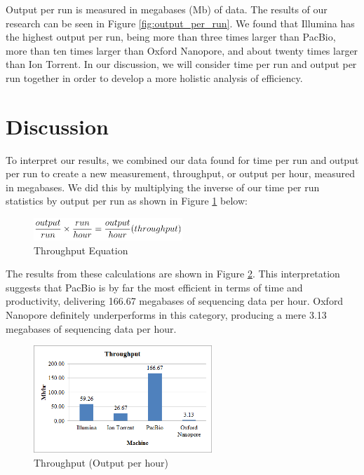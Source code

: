 \documentclass[12pt,letterpaper]{report}
\begin{document}
Output per run is measured in megabases (Mb) of data. The results of our research can be seen in Figure \ref{fig:output_per_run}. We found that Illumina has the highest output per run, being more than three times larger than PacBio, more than ten times larger than Oxford Nanopore, and about twenty times larger than Ion Torrent. In our discussion, we will consider time per run and output per run together in order to develop a more holistic analysis of efficiency.

\section{Discussion}

To interpret our results, we combined our data found for time per run and output per run to create a new measurement, throughput, or output per hour, measured in megabases. We did this by multiplying the inverse of our time per run statistics by output per run as shown in Figure \ref{fig:throughput_eq} below:

\begin{figure}[hr] %
  \begin{center}
    \includegraphics[width=0.5\textwidth]{throughput_eq.png}
  \end{center}
  \caption{Throughput Equation}
  \vspace{-10pt}
  \label{fig:throughput_eq}
\end{figure}

The results from these calculations are shown in Figure \ref{fig:throughput_per_hour}. This interpretation suggests that PacBio is by far the most efficient in terms of time and productivity, delivering 166.67 megabases of sequencing data per hour. Oxford Nanopore definitely underperforms in this category, producing a mere 3.13 megabases of sequencing data per hour. 

\begin{figure}[hr] %
  \begin{center}
    \includegraphics[width=0.6\textwidth]{throughput_per_hour.png}
  \end{center}
  \caption{Throughput (Output per hour)}
  \vspace{-10pt}
  \label{fig:throughput_per_hour}
\end{figure}
\end{document}
